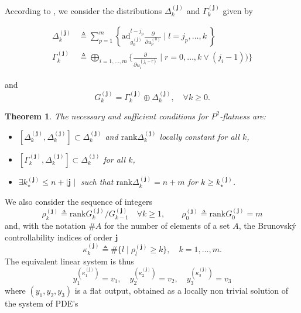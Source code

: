\documentclass[10pt]{article}
\newcommand{\3}{\mathbf{3}}
\newcommand{\2}{\mathbf{2}}
\newcommand{\1}{\mathbf{1}}
\newcommand{\0}{\mathbf{0}}
\newcommand{\bj}{\mathbf{j}}
\newcommand{\mbf}[1]{\mathbf{#1}}
\newcommand{\rk}{\mathrm{rank}}
\newcommand{\ad}{\mathrm{ad}}
\newcommand{\ddu}[2]{\frac{\partial}{\partial u_{#1}^{(#2)}}}
\newtheorem{thm}{Theorem}
\begin{document}
According to \cite{Levine2023},  we consider the distributions
$\Delta_{k}^{(\mbf{j})}$ and $\Gamma_{k}^{(\mbf{j})}$ given by

\begin{equation}\label{Deltadef:eq}
\begin{aligned}
\Delta_{k}^{(\mbf{j})} &\triangleq \sum_{p=1}^{m} \left\{ \ad_{g_{0}^{(\mbf{j})}}^{l-j_{p}}\ddu{p}{0}  \mid l= j_{p}, \ldots, k\ \right\}\\
\Gamma_{k}^{(\mbf{j})} &\triangleq \bigoplus_{i=1, \ldots, m}\{\ddu{i}{j_{i}-r} \mid r=0, \ldots, k\vee(j_{i}-1))\}
\end{aligned}
\end{equation}

and
\begin{equation}\label{G-k-j:eq}
G_{k}^{(\mbf{j})} =  \Gamma_{k}^{(\mbf{j})} \oplus \Delta_{k}^{(\mbf{j})}, \quad \forall k\geq 0.
\end{equation}

\begin{thm}
\label{CNSP2:thm}
The necessary and sufficient conditions for $P^2$-flatness are:
\begin{itemize}
\item[(i)] $[\Delta_{k}^{(\mbf{j})}, \Delta_{k}^{(\mbf{j})}] \subset \Delta_{k}^{(\mbf{j})}$ and $\rk \Delta_{k}^{(\mbf{j})}$  locally constant for all $k$,
\item[(ii)]$[\Gamma_{k}^{(\mbf{j})}, \Delta_{k}^{(\mbf{j})}] \subset \Delta_{k}^{(\mbf{j})}$ for all $k$,
\item[(iii)] $\exists k_{\star}^{(\mbf{j})} \leq n+\mid \bj \mid$ such that $\rk \Delta_{k}^{(\mbf{j})} = n+m$ for $k\geq k_{\star}^{(\mbf{j})}$.
\end{itemize}
\end{thm}

We also consider the sequence of integers
$$\rho_{k}^{(\bj)} \triangleq \rk  G_{k}^{(\bj)} / G_{k-1}^{(\bj)}  \quad \forall k\geq 1,  \qquad \rho_{0}^{(\bj)} \triangleq \rk G_{0}^{(\bj)} = m$$
and, with the notation $ \# A$ for the number of elements of a set $A$, the Brunovsk\'{y} controllability indices of order $\bj$
$$\kappa_{k}^{(\bj)} \triangleq \# \{ l \mid \rho_{l}^{(\bj)} \geq k \}, \quad k= 1,\ldots, m.$$
The equivalent linear system is thus
$$y_{1}^{(\kappa_{1}^{(\bj)})}=v_{1}, \quad y_{2}^{(\kappa_{2}^{(\bj)})}=v_{2}, \quad y_{3}^{(\kappa_{3}^{(\bj)})}=v_{3}$$
where $(y_{1}, y_{2}, y_{3})$ is a flat output, obtained as a locally non trivial solution
of the system of PDE's
\end{document}
